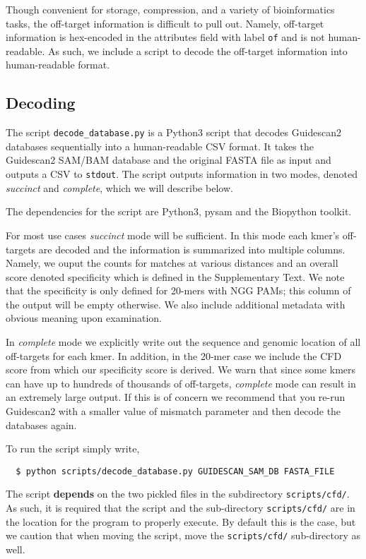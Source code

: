 \documentclass[11pt]{article}
\begin{document}
Though convenient for storage, compression, and a variety of
bioinformatics tasks, the off-target information is difficult to pull
out. Namely, off-target information is hex-encoded in the attributes
field with label \texttt{of} and is not human-readable. As such, we
include a script to decode the off-target information into
human-readable format.

\subsection{Decoding}

The script \texttt{decode\_database.py} is a Python3 script that decodes
Guidescan2 databases sequentially into a human-readable CSV format. It
takes the Guidescan2 SAM/BAM database and the original FASTA file as
input and outputs a CSV to \texttt{stdout}. The script outputs
information in two modes, denoted {\it succinct} and {\it
  complete}, which we will describe below.

The dependencies for the script are Python3, pysam and the Biopython toolkit.

For most use cases {\it succinct} mode will be sufficient. In this
mode each kmer's off-targets are decoded and the information is
summarized into multiple columns. Namely, we ouput the counts for
matches at various distances and an overall score denoted specificity
which is defined in the Supplementary Text. We note that the
specificity is only defined for 20-mers with NGG PAMs; this column of
the output will be empty otherwise. We also include additional
metadata with obvious meaning upon examination.

In {\it complete} mode we explicitly write out the sequence and
genomic location of all off-targets for each kmer. In addition, in the
20-mer case we include the CFD score from which our specificity score
is derived. We warn that since some kmers can have up to hundreds of
thousands of off-targets, {\it complete} mode can result in an
extremely large output. If this is of concern we recommend that you
re-run Guidescan2 with a smaller value of mismatch parameter and then
decode the databases again.

To run the script simply write,
\begin{verbatim}
  $ python scripts/decode_database.py GUIDESCAN_SAM_DB FASTA_FILE 
\end{verbatim}
The script \textbf{depends} on the two pickled files in the
subdirectory \texttt{scripts/cfd/}. As such, it is required that the
script and the sub-directory \texttt{scripts/cfd/} are in the location
for the program to properly execute. By default this is the
case, but we caution that when moving the script, move the
\texttt{scripts/cfd/} sub-directory as well.
\end{document}
